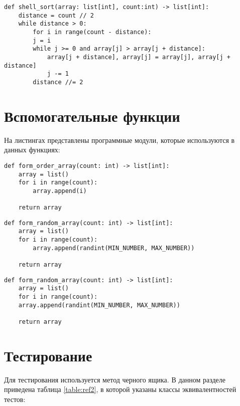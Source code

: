 \begin{lstlisting}[label=code3,caption=Программный код сортировки методом Шелла.]
def shell_sort(array: list[int], count:int) -> list[int]:
	distance = count // 2
	while distance > 0:
		for i in range(count - distance):
		j = i
		while j >= 0 and array[j] > array[j + distance]:
			array[j + distance], array[j] = array[j], array[j + distance]
			j -= 1
		distance //= 2
\end{lstlisting}

\section{Вспомогательные функции}
На листингах представлены программные модули, которые используются в данных функциях:
\begin{lstlisting}[label=code4,caption=Программный код формирования упорядоченного массива целых чисел.]
def form_order_array(count: int) -> list[int]:
	array = list()
	for i in range(count):
		array.append(i)

	return array
\end{lstlisting}

\begin{lstlisting}[label=code5,caption=Программный код формирования массива случайных целых чисел.]
def form_random_array(count: int) -> list[int]:
	array = list()
	for i in range(count):
		array.append(randint(MIN_NUMBER, MAX_NUMBER))
	
	return array
\end{lstlisting}

\begin{lstlisting}[label=code6,caption=Программный код формирования массива целых чисел\, упорядоченных в обратном порядке.]
	def form_random_array(count: int) -> list[int]:
	array = list()
	for i in range(count):
	array.append(randint(MIN_NUMBER, MAX_NUMBER))
	
	return array
\end{lstlisting}

\section{Тестирование}
Для тестирования используется метод черного ящика. В данном разделе приведена таблица \ref{table:ref2}, в которой указаны классы эквивалентностей тестов: \\

